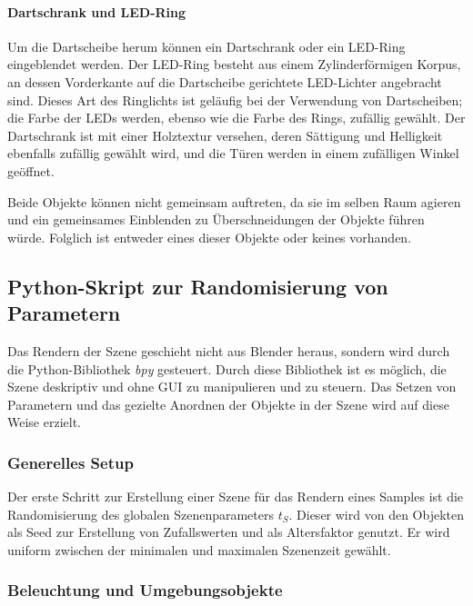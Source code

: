 \paragraph{Dartschrank und LED-Ring}
\label{sec:impl:daten:blender:nebenobjekte:cabinet}

Um die Dartscheibe herum können ein Dartschrank oder ein LED-Ring eingeblendet werden. Der LED-Ring besteht aus einem Zylinderförmigen Korpus, an dessen Vorderkante auf die Dartscheibe gerichtete LED-Lichter angebracht sind. Dieses Art des Ringlichts ist geläufig bei der Verwendung von Dartscheiben; die Farbe der LEDs werden, ebenso wie die Farbe des Rings, zufällig gewählt. Der Dartschrank ist mit einer Holztextur versehen, deren Sättigung und Helligkeit ebenfalls zufällig gewählt wird, und die Türen werden in einem zufälligen Winkel geöffnet.

Beide Objekte können nicht gemeinsam auftreten, da sie im selben Raum agieren und ein gemeinsames Einblenden zu Überschneidungen der Objekte führen würde. Folglich ist entweder eines dieser Objekte oder keines vorhanden.


\subsection{Python-Skript zur Randomisierung von Parametern}
\label{sec:impl:daten:python}

Das Rendern der Szene geschieht nicht aus Blender heraus, sondern wird durch die Python-Bibliothek \textit{bpy} gesteuert. Durch diese Bibliothek ist es möglich, die Szene deskriptiv und ohne GUI zu manipulieren und zu steuern. Das Setzen von Parametern und das gezielte Anordnen der Objekte in der Szene wird auf diese Weise erzielt.

\subsubsection{Generelles Setup}
\label{sec:impl:daten:python:setup}

Der erste Schritt zur Erstellung einer Szene für das Rendern eines Samples ist die Randomisierung des globalen Szenenparameters $t_S$. Dieser wird von den Objekten als Seed zur Erstellung von Zufallswerten und als Altersfaktor genutzt. Er wird uniform zwischen der minimalen und maximalen Szenenzeit gewählt.

\subsubsection{Beleuchtung und Umgebungsobjekte}
\label{sec:impl:daten:python:licht}

